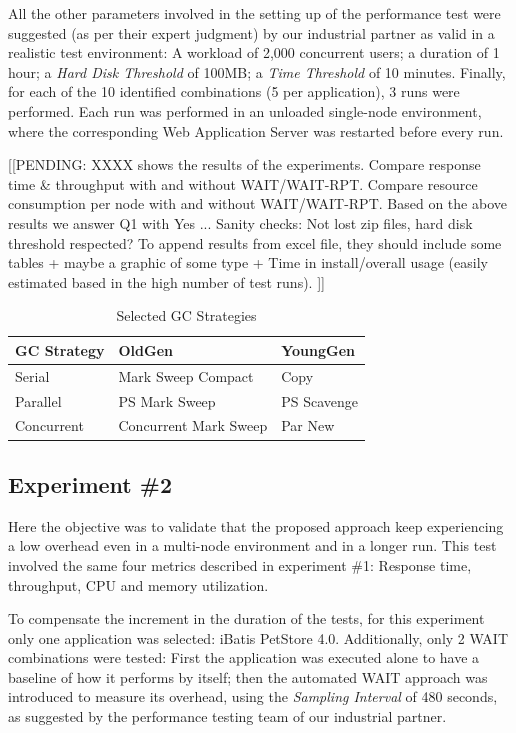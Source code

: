 \documentclass[runningheads,a4paper]{llncs}
\begin{document}
All the other parameters involved in the setting up of the performance test were
suggested (as per their expert judgment) by our industrial partner as valid in a 
realistic test environment: A workload of 2,000 concurrent users; a duration of
1 hour; a \emph{Hard Disk Threshold} of 100MB; a \emph{Time Threshold} of 10
minutes. Finally, for each of the 10 identified combinations (5 per
application), 3 runs were performed. Each run was performed in an unloaded
single-node environment, where the corresponding Web Application Server was restarted 
before every run.

[[PENDING: 
\figurename XXXX shows the results of the experiments. 
Compare response time \& throughput with and without WAIT/WAIT-RPT.
Compare resource consumption per node with and without WAIT/WAIT-RPT.
Based on the above results we answer Q1 with Yes ...
Sanity checks: Not lost zip files, hard disk threshold respected?
To append results from excel file, they should include some tables
+ maybe a graphic of some type
+ Time in install/overall usage (easily estimated based in the high number of
test runs).
]]

\begin{table}[!h]
\caption{Selected GC Strategies}
\label{Selected_GCS}
\centering
\begin{tabular}{l|l|l}
\hline
\bfseries GC Strategy & \bfseries OldGen & \bfseries YoungGen\\
\hline
Serial & Mark Sweep Compact & Copy\\
Parallel & PS Mark Sweep & PS Scavenge\\
Concurrent & Concurrent Mark Sweep & Par New\\
\hline
\end{tabular}
\end{table}



\subsection{Experiment \#2}

Here the objective was to validate that the proposed approach keep experiencing
a low overhead even in a multi-node environment and in a longer run. This test
involved the same four metrics described in experiment \#1: Response time, throughput, CPU and memory utilization.

To compensate the increment in the duration of the tests, for this experiment 
only one application was selected: iBatis PetStore 4.0. Additionally, only 2 WAIT 
combinations were tested: First the application was executed alone to have a
baseline of how it performs by itself; then the automated WAIT approach was introduced 
to measure its overhead, using the \emph{Sampling Interval} of 480 seconds, as
suggested by the performance testing team of our industrial partner.
\end{document}
